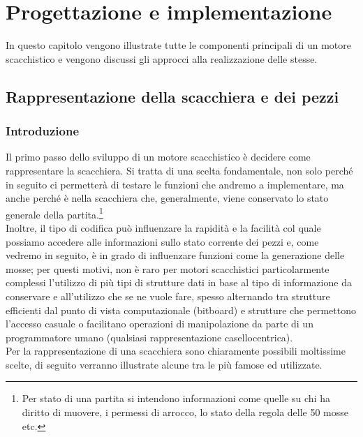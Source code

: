 \chapter{Progettazione e implementazione}
%

\begin{citazione}
    In questo capitolo vengono illustrate tutte le componenti principali di un motore scacchistico e vengono discussi gli approcci alla realizzazione delle stesse.
\end{citazione}

\newpage
\section{Rappresentazione della scacchiera e dei pezzi}

\subsection{Introduzione} %

Il primo passo dello sviluppo di un motore scacchistico è decidere come rappresentare la scacchiera. Si tratta di una scelta fondamentale, non solo perché in seguito ci permetterà
di testare le funzioni che andremo a implementare, ma anche perché è nella scacchiera che, generalmente,
viene conservato lo stato generale della partita.\footnote{Per stato di una partita si intendono informazioni come
quelle su chi ha diritto di muovere, i permessi di arrocco, lo stato della regola delle 50 mosse etc.}
\\Inoltre, il tipo di codifica può influenzare la rapidità
e la facilità col quale possiamo accedere alle informazioni sullo stato corrente dei pezzi
e, come vedremo in seguito, è in grado di influenzare funzioni come la generazione delle mosse; per questi motivi,
non è raro per motori scacchistici particolarmente complessi l'utilizzo di più tipi di strutture dati in base
al tipo di informazione da conservare e all'utilizzo che se ne vuole fare, spesso alternando tra strutture efficienti dal punto di vista computazionale (bitboard) e strutture che permettono l'accesso casuale o facilitano 
operazioni di manipolazione da parte di un programmatore umano (qualsiasi rappresentazione casellocentrica).
\\Per la rappresentazione di una scacchiera sono chiaramente possibili moltissime scelte, di seguito
verranno illustrate alcune tra le più famose ed utilizzate.

